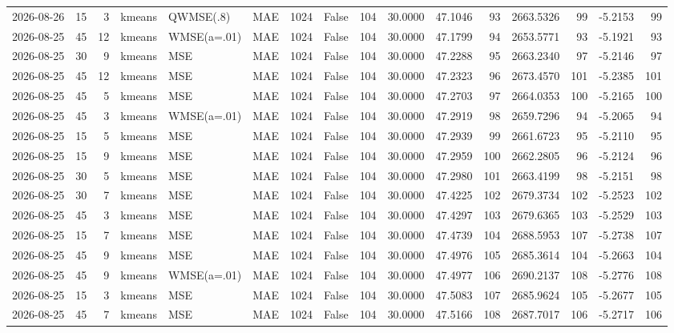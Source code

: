 \documentclass[10pt]{article}
\begin{document}
\begin{landscape}
\begin{longtable}{@{}lrrlllrcrrrrrrrr@{}}
2026-08-26 & 15 & 3 & kmeans & QWMSE(.8) & MAE & 1024 & False & 104 & 30.0000 & 47.1046 & 93 & 2663.5326 & 99 & -5.2153 & 99 \\
2026-08-25 & 45 & 12 & kmeans & WMSE(a=.01) & MAE & 1024 & False & 104 & 30.0000 & 47.1799 & 94 & 2653.5771 & 93 & -5.1921 & 93 \\
2026-08-25 & 30 & 9 & kmeans & MSE & MAE & 1024 & False & 104 & 30.0000 & 47.2288 & 95 & 2663.2340 & 97 & -5.2146 & 97 \\
2026-08-25 & 45 & 12 & kmeans & MSE & MAE & 1024 & False & 104 & 30.0000 & 47.2323 & 96 & 2673.4570 & 101 & -5.2385 & 101 \\
2026-08-25 & 45 & 5 & kmeans & MSE & MAE & 1024 & False & 104 & 30.0000 & 47.2703 & 97 & 2664.0353 & 100 & -5.2165 & 100 \\
2026-08-25 & 45 & 3 & kmeans & WMSE(a=.01) & MAE & 1024 & False & 104 & 30.0000 & 47.2919 & 98 & 2659.7296 & 94 & -5.2065 & 94 \\
2026-08-25 & 15 & 5 & kmeans & MSE & MAE & 1024 & False & 104 & 30.0000 & 47.2939 & 99 & 2661.6723 & 95 & -5.2110 & 95 \\
2026-08-25 & 15 & 9 & kmeans & MSE & MAE & 1024 & False & 104 & 30.0000 & 47.2959 & 100 & 2662.2805 & 96 & -5.2124 & 96 \\
2026-08-25 & 30 & 5 & kmeans & MSE & MAE & 1024 & False & 104 & 30.0000 & 47.2980 & 101 & 2663.4199 & 98 & -5.2151 & 98 \\
2026-08-25 & 30 & 7 & kmeans & MSE & MAE & 1024 & False & 104 & 30.0000 & 47.4225 & 102 & 2679.3734 & 102 & -5.2523 & 102 \\
2026-08-25 & 45 & 3 & kmeans & MSE & MAE & 1024 & False & 104 & 30.0000 & 47.4297 & 103 & 2679.6365 & 103 & -5.2529 & 103 \\
2026-08-25 & 15 & 7 & kmeans & MSE & MAE & 1024 & False & 104 & 30.0000 & 47.4739 & 104 & 2688.5953 & 107 & -5.2738 & 107 \\
2026-08-25 & 45 & 9 & kmeans & MSE & MAE & 1024 & False & 104 & 30.0000 & 47.4976 & 105 & 2685.3614 & 104 & -5.2663 & 104 \\
2026-08-25 & 45 & 9 & kmeans & WMSE(a=.01) & MAE & 1024 & False & 104 & 30.0000 & 47.4977 & 106 & 2690.2137 & 108 & -5.2776 & 108 \\
2026-08-25 & 15 & 3 & kmeans & MSE & MAE & 1024 & False & 104 & 30.0000 & 47.5083 & 107 & 2685.9624 & 105 & -5.2677 & 105 \\
2026-08-25 & 45 & 7 & kmeans & MSE & MAE & 1024 & False & 104 & 30.0000 & 47.5166 & 108 & 2687.7017 & 106 & -5.2717 & 106 \\

\end{longtable}
\end{landscape}
\end{document}
